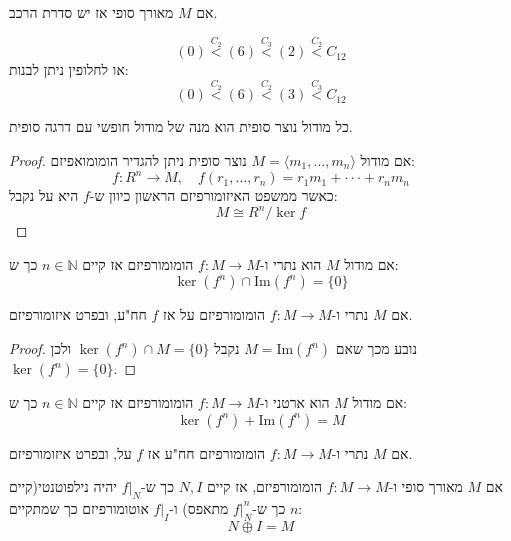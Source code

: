 \documentclass{tstextbook}
\begin{document}
\begin{corollary}
אם \(M\) מאורך סופי אז יש סדרת הרכב.

\end{corollary}
\begin{example}
$$(0)\overset{C_{2}}{<}(6)\overset{C_{3}}{<}  (2)\overset{C_{2}}{<}   C_{12}$$
או לחלופין ניתן לבנות:
$$(0)\overset{C_{2}}{<} (6) \overset{C_{2}}{<} (3)\overset{C_{3}}{<} C_{12}$$

\end{example}
\begin{proposition}
כל מודול נוצר סופית הוא מנה של מודול חופשי עם דרגה סופית.

\end{proposition}
\begin{proof}
אם מודול \(M=\langle m_{1},\dots,m_{n} \rangle\) נוצר סופית ניתן להגדיר הומומואפיזם:
$$f:R^{n}\rightarrow{M},\quad f(r_{1},\ldots,r_{n})=r_{1}m_{1}+\cdot\cdot\cdot+r_{n}m_{n}$$
כאשר ממשפט האיזומורפיזם הראשון כיוון ש-\(f\) היא על נקבל:
$$M\cong R^{n}/\ker f$$

\end{proof}
\begin{lemma}
אם מודול \(M\) הוא נתרי ו-\(f:M\to M\) הומומורפיזם אז קיים \(n \in \mathbb{N}\) כך ש:
$$\ker (f^{n})\cap \mathrm{\mathrm{Im}}(f^{n})=\{ 0 \}$$

\end{lemma}
\begin{corollary}
אם \(M\) נתרי ו-\(f:M\to M\) הומומורפיזם על אז \(f\) חח"ע, ובפרט איזומורפיזם.

\end{corollary}
\begin{proof}
נובע מכך שאם \(M=\mathrm{Im}(f^{n})\) נקבל \(\ker(f^{n})\cap M=\{ 0 \}\) ולכן \(\ker(f^{n})=\{ 0 \}\).

\end{proof}
\begin{lemma}
אם מודול \(M\) הוא ארטני ו-\(f:M\to M\) הומומורפיזם אז קיים \(n \in \mathbb{N}\) כך ש:
$$\ker (f^{n})+\mathrm{Im}(f^{n})=M$$

\end{lemma}
\begin{corollary}
אם \(M\) נתרי ו-\(f:M\to M\) הומומורפיזם חח"ע אז \(f\) על, ובפרט איזומורפיזם.

\end{corollary}
\begin{proposition}
אם \(M\) מאורך סופי ו-\(f:M\to M\) הומומורפיזם, אז קיים \(N,I\) כך ש-\(f|_{N}\) יהיה נילפוטנטי(קיים \(n\) כך ש-\(f|_{N}^{n}\) מתאפס) ו-\(f|_{I}\) אוטומורפיזם כך שמתקיים:
$$N\oplus I = M$$

\end{proposition}
\end{document}
